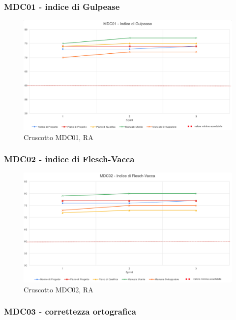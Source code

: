 \subsubsection*{MDC01 - indice di Gulpease}

\begin{figure}[H] 
    \centering
    \includegraphics[scale = 0.6]{immagini/ImmRA/MDC01.png}
    \caption{Cruscotto MDC01, RA}
\end{figure}

\subsubsection*{MDC02 - indice di Flesch-Vacca}

\begin{figure}[H] 
    \centering
    \includegraphics[scale = 0.6]{immagini/ImmRA/MDC02.png}
    \caption{Cruscotto MDC02, RA}
\end{figure}

\subsubsection*{MDC03 - correttezza ortografica}

